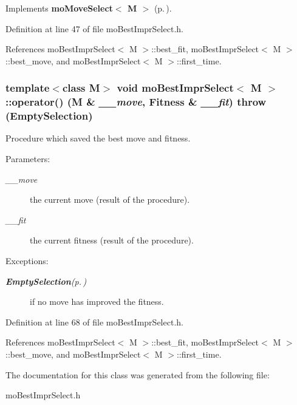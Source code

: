 Implements {\bf mo\-Move\-Select$<$ M $>$} {\rm (p.\,\pageref{classmo_move_select_7c157b6e64fd417acf6e900059204eb1})}.

Definition at line 47 of file mo\-Best\-Impr\-Select.h.

References mo\-Best\-Impr\-Select$<$ M $>$::best\_\-fit, mo\-Best\-Impr\-Select$<$ M $>$::best\_\-move, and mo\-Best\-Impr\-Select$<$ M $>$::first\_\-time.
\subsubsection{\setlength{\rightskip}{0pt plus 5cm}template$<$class M$>$ void {\bf mo\-Best\-Impr\-Select}$<$ M $>$::operator() (M \& {\em \_\-\_\-move}, {\bf Fitness} \& {\em \_\-\_\-fit})  throw ({\bf Empty\-Selection})\hspace{0.3cm}{\tt  [inline]}}\label{classmo_best_impr_select_169773d4d127acd782cf379f758222da}


Procedure which saved the best move and fitness. 

\begin{Desc}
\item[Parameters:]
\begin{description}
\item[{\em \_\-\_\-move}]the current move (result of the procedure). \item[{\em \_\-\_\-fit}]the current fitness (result of the procedure). \end{description}
\end{Desc}
\begin{Desc}
\item[Exceptions:]
\begin{description}
\item[{\em {\bf Empty\-Selection}{\rm (p.\,\pageref{class_empty_selection})}}]if no move has improved the fitness. \end{description}
\end{Desc}


Definition at line 68 of file mo\-Best\-Impr\-Select.h.

References mo\-Best\-Impr\-Select$<$ M $>$::best\_\-fit, mo\-Best\-Impr\-Select$<$ M $>$::best\_\-move, and mo\-Best\-Impr\-Select$<$ M $>$::first\_\-time.

The documentation for this class was generated from the following file:\begin{CompactItemize}
\item 
mo\-Best\-Impr\-Select.h\end{CompactItemize}

